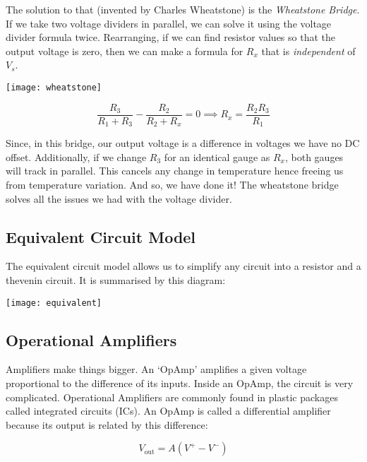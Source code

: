 \documentclass[12pt]{article}
\begin{document}
The solution to that (invented by Charles Wheatstone) is the \textit{Wheatstone Bridge}.
If we take two voltage dividers in parallel, we can solve it using the voltage divider formula twice. 
Rearranging, if we can find resistor values so that the output voltage is zero, then we can make a formula for $R_x$ that is \textit{independent} of $V_s$.

\begin{marginfigure}
  \vspace{ -2cm }
  \texttt{[image: wheatstone]}
\end{marginfigure}

\begin{equation*}
  \frac{R_3}{R_1+R_3} - \frac{R_2}{R_2 + R_x} = 0 \implies R_x = \frac{R_2R_3}{R_1}
\end{equation*}

Since, in this bridge, our output voltage is a difference in voltages we have no DC offset. 
Additionally, if we change $R_3$ for an identical gauge as $R_x$, both gauges will track in parallel.
This cancels any change in temperature hence freeing us from temperature variation.
And so, we have done it! The wheatstone bridge solves all the issues we had with the voltage divider.

\subsection{Equivalent Circuit Model}
The equivalent circuit model allows us to simplify any circuit into a resistor and a thevenin circuit.
It is summarised by this diagram:

\begin{center}
  \texttt{[image: equivalent]}
\end{center}

\subsection{Operational Amplifiers}
Amplifiers make things bigger.
An `OpAmp' amplifies a given voltage proportional to the difference of its inputs.
Inside an OpAmp, the circuit is very complicated.
Operational Amplifiers are commonly found in plastic packages called integrated circuits (ICs).
An OpAmp is called a differential amplifier because its output is related by this difference:

\begin{equation*}
  V_{\text{out}} = A(V^+ - V^-)
\end{equation*}
\end{document}

